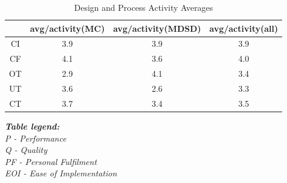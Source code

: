 \documentclass[final_report_innit.tex]{subfiles}
\begin{document}
\begin{table}[h]
\caption{Design and Process Activity Averages}
\centering
\begin{tabular}{@{}c|c|c|c|@{}}
\cmidrule(l){2-4}
\multicolumn{1}{l|}{}    & \multicolumn{1}{l|}{avg/activity(MC)} & \multicolumn{1}{l|}{avg/activity(MDSD)} & \multicolumn{1}{l|}{avg/activity(all)} \\ \midrule
\multicolumn{1}{|c|}{CI} & 3.9                                & 3.9                                 & 3.9                                 \\ \midrule
\multicolumn{1}{|c|}{CF} & 4.1                                & 3.6                                 & 4.0                                 \\ \midrule
\multicolumn{1}{|c|}{OT} & 2.9                                & 4.1                                 & 3.4                                 \\ \midrule
\multicolumn{1}{|c|}{UT} & 3.6                                & 2.6                                 & 3.3                                 \\ \midrule
\multicolumn{1}{|c|}{CT} & 3.7                                & 3.4                                 & 3.5                                 \\ \bottomrule
\end{tabular}
\end{table}

\noindent
\textit{
\textbf{\hspace{12 mm}Table legend:}
\\
\hspace*{13 mm}P - Performance
\\
\hspace*{13 mm}Q - Quality
\\
\hspace*{13 mm}PF - Personal Fulfilment
\\
\hspace*{13 mm}EOI - Ease of Implementation
}
\end{document}
